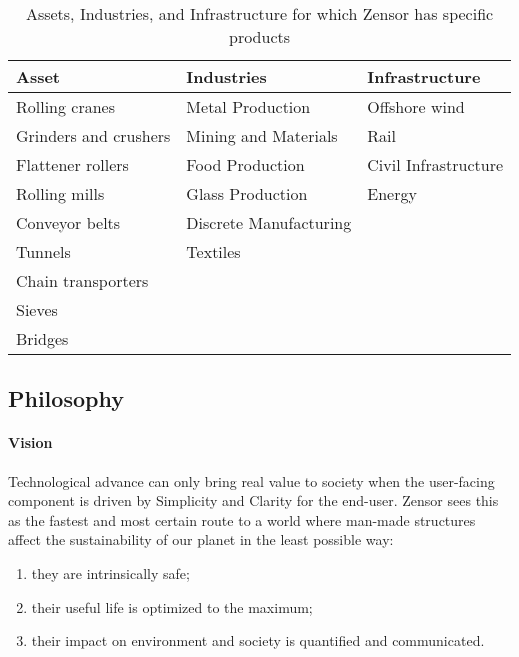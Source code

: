 \begin{table}[ht]
    \caption{Assets, Industries, and Infrastructure for which Zensor has specific products}
    \begin{tabular}{@{}lll@{}}
    \toprule
    Asset                 & Industries                       & Infrastructure                       \\ \midrule
    Rolling cranes        & Metal Production                 & Offshore wind                        \\
    Grinders and crushers & Mining and Materials             & Rail                                 \\
    Flattener rollers     & Food Production                  & Civil Infrastructure                 \\
    Rolling mills         & Glass Production                 & Energy                               \\
    Conveyor belts        & Discrete Manufacturing                                                  \\
    Tunnels               & Textiles                                                                \\
    Chain transporters    &                                                                         \\
    Sieves                &                                                                         \\
    Bridges               &                                                                         \\ \bottomrule
\end{tabular}
\end{table}
\subsection{Philosophy}
\paragraph{Vision} 
Technological advance can only bring real value to society when the user-facing component is driven by Simplicity and Clarity for the end-user. 
Zensor sees this as the fastest and most certain route to a world where man-made structures affect the sustainability of our planet in the least possible way:
\begin{enumerate}
    \item they are intrinsically safe;
    \item their useful life is optimized to the maximum;
    \item their impact on environment and society is quantified and communicated.
\end{enumerate}

